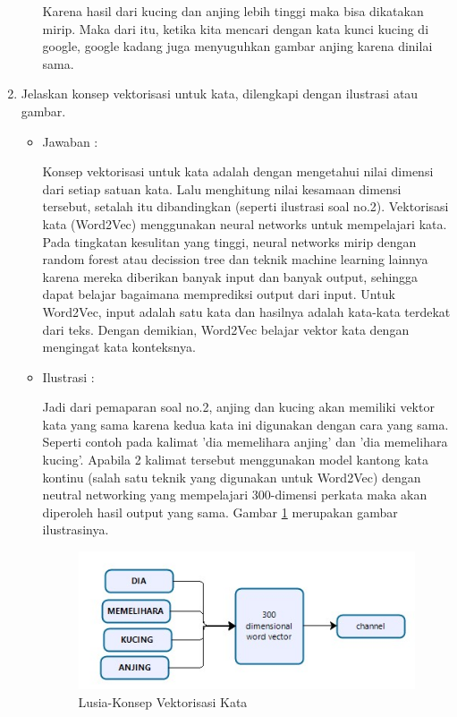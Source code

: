 \begin{enumerate}
\begin{itemize}
		\par Karena hasil dari kucing dan anjing lebih tinggi maka bisa dikatakan  mirip. Maka dari itu, ketika kita mencari dengan kata kunci kucing di google, google kadang juga menyuguhkan gambar anjing karena dinilai sama.
	\end{itemize}

\item Jelaskan konsep vektorisasi untuk kata, dilengkapi dengan ilustrasi atau gambar.
	\begin{itemize}
	\item Jawaban :
		\par Konsep vektorisasi untuk kata adalah dengan mengetahui nilai dimensi dari setiap satuan kata. Lalu menghitung nilai kesamaan dimensi tersebut, setalah itu dibandingkan (seperti ilustrasi soal no.2). Vektorisasi kata (Word2Vec) menggunakan neural networks untuk mempelajari kata. Pada tingkatan kesulitan yang tinggi, neural networks mirip dengan random forest atau decission tree dan teknik machine learning lainnya karena mereka diberikan banyak input dan banyak output, sehingga dapat belajar bagaimana memprediksi output dari input. Untuk Word2Vec, input adalah satu kata dan hasilnya adalah kata-kata terdekat dari teks. Dengan demikian, Word2Vec belajar vektor kata dengan mengingat kata konteksnya.
	\item Ilustrasi :
		\par Jadi dari pemaparan soal no.2, anjing dan kucing akan memiliki vektor kata yang sama karena kedua kata ini digunakan dengan cara yang sama. Seperti contoh pada kalimat 'dia memelihara anjing' dan 'dia memelihara kucing'. Apabila 2 kalimat tersebut menggunakan model kantong kata kontinu (salah satu teknik yang digunakan untuk Word2Vec) dengan neutral networking yang mempelajari 300-dimensi perkata maka akan diperoleh hasil output yang sama. Gambar \ref{5a4} merupakan gambar ilustrasinya.
			\begin{figure}[ht]
			\centering
			\includegraphics[scale=0.5]{figures/p3.jpg}
			\caption{Lusia-Konsep Vektorisasi Kata}
			\label{5a4}
			\end{figure}
	\end{itemize}


\end{enumerate}
